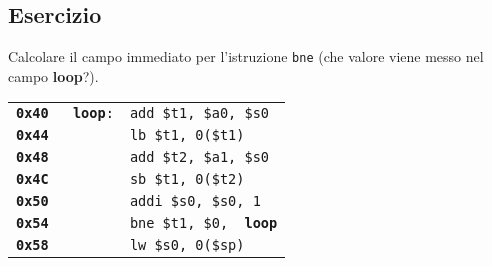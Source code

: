 \documentclass[../main.tex]{subfiles}
\begin{document}
    \begin{table}[h!]
        \begin{minipage}{.03\linewidth}
            \hspace*{0cm}
        \end{minipage}
        \begin{minipage}{.97\linewidth}
            \subsection*{Esercizio}
            Calcolare il campo immediato per l'istruzione \texttt{bne}
            (che valore viene messo nel campo {\color{blue} \textbf{loop}}?).
        \end{minipage}

        \vspace*{3mm}

        \begin{minipage}{.06\linewidth}
            \hspace*{0cm}
        \end{minipage}
        \begin{minipage}{.94\linewidth}
            \begin{tabular}{ l l l }
                \textbf{\texttt{0x40}} & \texttt{{\color{blue} \textbf{loop}}:} & \texttt{add \hspace*{0cm} \hspace*{0cm} \$t1, \$a0, \$s0} \\
                \textbf{\texttt{0x44}} & & \texttt{lb \hspace*{0cm} \hspace*{0cm} \hspace*{0cm} \$t1, 0(\$t1)} \\
                \textbf{\texttt{0x48}} & & \texttt{add \hspace*{0cm} \hspace*{0cm} \$t2, \$a1, \$s0} \\
                \textbf{\texttt{0x4C}} & & \texttt{sb \hspace*{0cm} \hspace*{0cm} \hspace*{0cm} \$t1, 0(\$t2)} \\
                \textbf{\texttt{0x50}} & & \texttt{addi \hspace*{0cm} \$s0, \$s0, 1} \\
                \textbf{\texttt{0x54}} & & \texttt{bne \hspace*{0cm} \hspace*{0cm} \$t1, \$0, {\color{blue} \textbf{loop}}} \\
                \textbf{\texttt{0x58}} & & \texttt{lw \hspace*{0cm} \hspace*{0cm} \hspace*{0cm} \$s0, 0(\$sp)} \\
            \end{tabular}
        \end{minipage}


\end{table}
\end{document}
